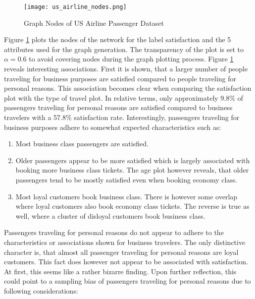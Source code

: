   \begin{figure}[h]
	  \centering
	  \texttt{[image: us\_airline\_nodes.png]}
	  \caption{Graph Nodes of US Airline Passenger Dataset}
      \label{fig:us_airline_nodes}
  \end{figure}

  \noindent Figure \ref{fig:us_airline_nodes} plots the nodes of the network
  for the label satisfaction and the 5 attributes used for the graph
  generation. The transparency of the plot is set to $\alpha = 0.6$ to avoid 
  covering nodes during the graph plotting process. Figure
  \ref{fig:us_airline_nodes} reveals interesting associations. First it is
  shown, that a larger number of people traveling for business purposes are 
  satisfied compared to people traveling for personal reasons. This association
  becomes clear when comparing the satisfaction plot with the type of travel
  plot. In relative terms, only approximately 9.8\% of passengers traveling for 
  personal reasons are satisfied compared to business travelers with a 57.8\% 
  satisfaction rate. Interestingly, passengers traveling for business purposes
  adhere to somewhat expected characteristics such as:

  \begin{enumerate}
    \item Most business class passengers are satisfied. 
    \item Older passengers appear to be more satisfied which is largely
      associated with booking more business class tickets. The age plot however 
      reveals, that older passengers tend to be mostly satisfied even when 
      booking economy class.
    \item Most loyal customers book business class. There is however some 
      overlap where loyal customers also book economy class tickets. The 
      reverse is true as well, where a cluster of disloyal customers book 
      business class. 
  \end{enumerate}
  
  \noindent Passengers traveling for personal reasons do not appear to adhere
  to the characteristics or associations shown for business travelers. The only
  distinctive character is, that almost all passenger traveling for personal
  reasons are loyal customers. This fact does however not appear to be
  associated with satisfaction. At first, this seems like a rather bizarre 
  finding. Upon further reflection, this could point to a sampling bias of 
  passengers traveling for personal reasons due to following considerations:

